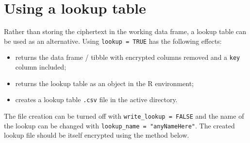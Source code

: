 \documentclass[
  12pt,
  krantz2]{krantz}
\makeatletter
\newenvironment{Shaded}{\begin{snugshade}}{\end{snugshade}}
\newcommand{\CommentTok}[1]{\textcolor[rgb]{0.56,0.35,0.01}{\textit{#1}}}
\newcommand{\DataTypeTok}[1]{\textcolor[rgb]{0.13,0.29,0.53}{#1}}
\newcommand{\KeywordTok}[1]{\textcolor[rgb]{0.13,0.29,0.53}{\textbf{#1}}}
\newcommand{\NormalTok}[1]{#1}
\newcommand{\OperatorTok}[1]{\textcolor[rgb]{0.81,0.36,0.00}{\textbf{#1}}}
\newcommand{\OtherTok}[1]{\textcolor[rgb]{0.56,0.35,0.01}{#1}}
\newcommand{\StringTok}[1]{\textcolor[rgb]{0.31,0.60,0.02}{#1}}
\providecommand{\tightlist}{%
  \setlength{\itemsep}{0pt}\setlength{\parskip}{0pt}}
\newenvironment{kframe}{%
\medskip{}
\setlength{\fboxsep}{.8em}
 \def\at@end@of@kframe{}%
 \ifinner\ifhmode%
  \def\at@end@of@kframe{\end{minipage}}%
  \begin{minipage}{\columnwidth}%
 \fi\fi%
 \def\FrameCommand##1{\hskip\@totalleftmargin \hskip-\fboxsep
 \colorbox{shadecolor}{##1}\hskip-\fboxsep
     \hskip-\linewidth \hskip-\@totalleftmargin \hskip\columnwidth}%
 \MakeFramed {\advance\hsize-\width
   \@totalleftmargin\z@ \linewidth\hsize
   \@setminipage}}%
 {\par\unskip\endMakeFramed%
 \at@end@of@kframe}
\renewenvironment{Shaded}{\begin{kframe}}{\end{kframe}}
\makeatother
\begin{document}
\hypertarget{using-a-lookup-table}{%
\section{Using a lookup table}\label{using-a-lookup-table}}


Rather than storing the ciphertext in the working data frame, a lookup table can be used as an alternative.
Using \texttt{lookup\ =\ TRUE} has the following effects:

\begin{itemize}
\tightlist
\item
  returns the data frame / tibble with encrypted columns removed and a \texttt{key} column included;
\item
  returns the lookup table as an object in the R environment;
\item
  creates a lookup table \texttt{.csv} file in the active directory.
\end{itemize}

\begin{Shaded}
\end{Shaded}

The file creation can be turned off with \texttt{write\_lookup\ =\ FALSE} and the name of the lookup can be changed with \texttt{lookup\_name\ =\ "anyNameHere"}.
The created lookup file should be itself encrypted using the method below.
\end{document}
